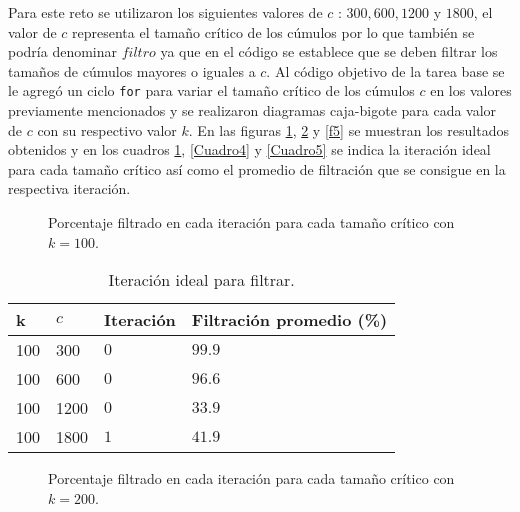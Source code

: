 \documentclass{article}
\begin{document}
Para este reto se utilizaron los siguientes valores de $c$ : $300, 600, 1200$ y $1800$, el valor de $c$ representa el tamaño crítico de los cúmulos por lo que también se podría denominar $filtro$ ya que en el código se establece que se deben filtrar los tamaños de cúmulos mayores o iguales a $c$. Al código objetivo de la tarea base se le agregó un ciclo \texttt{for} para variar el tamaño crítico de los cúmulos $c$ en los valores previamente mencionados y se realizaron diagramas caja-bigote para cada valor de $c$ con su respectivo valor $k$. En las figuras \ref{f3}, \ref{f4} y \ref{f5} se muestran los resultados obtenidos y en los cuadros \ref{Cuadro3}, \ref{Cuadro4} y \ref{Cuadro5} se indica la iteración ideal para cada tamaño crítico así como el promedio de filtración que se consigue en la respectiva iteración.

\newpage

\begin{figure}[h!]
\centering
{}
\caption{Porcentaje filtrado en cada iteración para cada tamaño crítico con $k = 100$.} 
\label{f3}
\end{figure}

\begin{table}[h!]
\centering
\caption{Iteración ideal para filtrar.}
\smallskip

\begin{tabular}{ |p{1cm}|p{1.5cm}|p{2cm}|p{3.8cm}|}
 \hline
 k & $c$ & Iteración & Filtración promedio (\%) \\
 \hline
 100 & 300 &  $0$ & $99.9$ \\
 \hline
 100 & 600 & $0$ & $96.6$\\
 \hline
 100 & 1200 & $0$ & $33.9$\\
 \hline
 100 & 1800 & $1$ & $41.9$\\
 \hline
\end{tabular}
\label{Cuadro3}
\end{table}

\newpage

\begin{figure}[h!]
\centering
{}
\caption{Porcentaje filtrado en cada iteración para cada tamaño crítico con $k = 200$.} 
\label{f4}
\end{figure}
\end{document}
